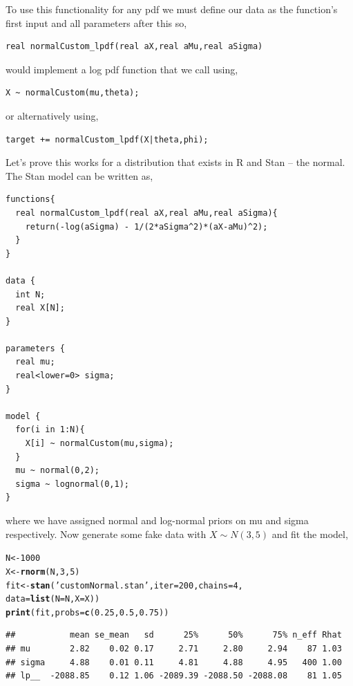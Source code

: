 \documentclass[11pt,fullpage]{book}
\makeatletter
\newenvironment{kframe}{%
	\def\at@end@of@kframe{}%
	\ifinner\ifhmode%
	\def\at@end@of@kframe{\end{minipage}}%
\begin{minipage}{\columnwidth}%
	\fi\fi%
	\def\FrameCommand##1{\hskip\@totalleftmargin \hskip-\fboxsep
		\colorbox{shadecolor}{##1}\hskip-\fboxsep
		\hskip-\linewidth \hskip-\@totalleftmargin \hskip\columnwidth}%
	\MakeFramed {\advance\hsize-\width
		\@totalleftmargin\z@ \linewidth\hsize
		\@setminipage}}%
{\par\unskip\endMakeFramed%
	\at@end@of@kframe}
\newcommand{\hlnum}[1]{\textcolor[rgb]{0.686,0.059,0.569}{#1}}%
\newcommand{\hlstr}[1]{\textcolor[rgb]{0.192,0.494,0.8}{#1}}%
\newcommand{\hlstd}[1]{\textcolor[rgb]{0.345,0.345,0.345}{#1}}%
\newcommand{\hlkwb}[1]{\textcolor[rgb]{0.69,0.353,0.396}{#1}}%
\newcommand{\hlkwc}[1]{\textcolor[rgb]{0.333,0.667,0.333}{#1}}%
\newcommand{\hlkwd}[1]{\textcolor[rgb]{0.737,0.353,0.396}{\textbf{#1}}}%
\newenvironment{knitrout}{}{} %
\makeatother
\begin{document}
To use this functionality for any pdf we must define our data as the function's first input and all parameters after this so,

\begin{verbatim}
real normalCustom_lpdf(real aX,real aMu,real aSigma)
\end{verbatim}

would implement a log pdf function that we call using,
\begin{verbatim}
X ~ normalCustom(mu,theta);
\end{verbatim}
or alternatively using,
\begin{verbatim}
target += normalCustom_lpdf(X|theta,phi);
\end{verbatim}

Let's prove this works for a distribution that exists in R and Stan -- the normal. The Stan model can be written as,

\begin{verbatim}
functions{
  real normalCustom_lpdf(real aX,real aMu,real aSigma){
    return(-log(aSigma) - 1/(2*aSigma^2)*(aX-aMu)^2);
  }
}

data { 
  int N; 
  real X[N]; 
} 

parameters { 
  real mu;
  real<lower=0> sigma;
}

model { 
  for(i in 1:N){
    X[i] ~ normalCustom(mu,sigma);
  }
  mu ~ normal(0,2);
  sigma ~ lognormal(0,1);
}
\end{verbatim}
where we have assigned normal and log-normal priors on mu and sigma respectively. Now generate some fake data with $X\sim N(3,5)$ and fit the model,

\begin{knitrout}\small
		\color{fgcolor}\begin{kframe}
			\begin{alltt}
\hlstd{N} \hlkwb{<-} \hlnum{1000}
\hlstd{X} \hlkwb{<-} \hlkwd{rnorm}\hlstd{(N,}\hlnum{3}\hlstd{,}\hlnum{5}\hlstd{)}
\hlstd{fit} \hlkwb{<-} \hlkwd{stan}\hlstd{(}\hlstr{'customNormal.stan'}\hlstd{,}\hlkwc{iter}\hlstd{=}\hlnum{200}\hlstd{,}\hlkwc{chains}\hlstd{=}\hlnum{4}\hlstd{,}
             \hlkwc{data}\hlstd{=}\hlkwd{list}\hlstd{(}\hlkwc{N}\hlstd{=N,}\hlkwc{X}\hlstd{=X))}
\hlkwd{print}\hlstd{(fit,}\hlkwc{probs} \hlstd{=} \hlkwd{c}\hlstd{(}\hlnum{0.25}\hlstd{,}\hlnum{0.5}\hlstd{,}\hlnum{0.75}\hlstd{))}
			\end{alltt}
			\begin{verbatim}
##           mean se_mean   sd      25%      50%      75% n_eff Rhat
## mu        2.82    0.02 0.17     2.71     2.80     2.94    87 1.03
## sigma     4.88    0.01 0.11     4.81     4.88     4.95   400 1.00
## lp__  -2088.85    0.12 1.06 -2089.39 -2088.50 -2088.08    81 1.05
			\end{verbatim}
		\end{kframe}
	\end{knitrout}
\end{document}
